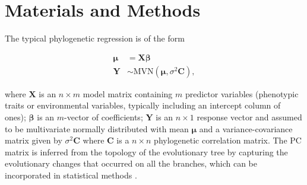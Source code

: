 \section{Materials and Methods}

\newcommand{\bX}{{\mathbf X}}
\newcommand{\bbeta}{{\boldsymbol \beta}}
\newcommand{\bmu}{{\boldsymbol \mu}}
\newcommand{\bY}{{\mathbf Y}}
\newcommand{\bC}{{\mathbf C}}
\newcommand{\bZ}{{\mathbf Z}}
\newcommand{\bb}{{\mathbf b}}
\newcommand{\bSigma}{{\boldsymbol \Sigma}}

The typical phylogenetic regression is of the form 


\begin{align}
\bmu & = \bX \bbeta  \label{eq:gls1} \\ 
\bY & \sim \textrm{MVN}(\bmu,\sigma^{2} \bC), \label{eq:gls2}
\end{align}

where $\bX$ is an $n \times m$ model matrix containing $m$ predictor variables (phenotypic traits or environmental variables, typically including an intercept column of ones); $\bbeta$ is an $m$-vector of coefficients; $\bY$ is an $n \times 1$ response vector and assumed to be multivariate normally distributed with mean $\bmu$ and a variance-covariance matrix given by $\sigma^{2} \bC$ where $\bC$ is a $n \times n$ phylogenetic correlation matrix.
The PC matrix is inferred from the topology of the evolutionary tree by capturing the evolutionary changes that occurred on all the branches, which can be incorporated in statistical methods \citep{garamszegi2014modern}.


